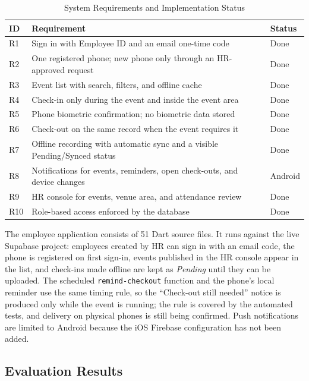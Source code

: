 \documentclass[conference]{IEEEtran}
\begin{document}
\begin{table}[!t]
\caption{System Requirements and Implementation Status}
\label{tab:requirements}
\centering
\footnotesize
\begin{tabularx}{\columnwidth}{@{}l Y l@{}}
\toprule
ID & Requirement & Status\\
\midrule
R1 & Sign in with Employee ID and an email one-time code &
Done\\
R2 & One registered phone; new phone only through an HR-approved
request & Done\\
R3 & Event list with search, filters, and offline cache & Done\\
R4 & Check-in only during the event and inside the event area &
Done\\
R5 & Phone biometric confirmation; no biometric data stored & Done\\
R6 & Check-out on the same record when the event requires it &
Done\\
R7 & Offline recording with automatic sync and a visible
Pending/Synced status & Done\\
R8 & Notifications for events, reminders, open check-outs, and
device changes & Android\\
R9 & HR console for events, venue area, and attendance review &
Done\\
R10 & Role-based access enforced by the database & Done\\
\bottomrule
\end{tabularx}
\end{table}

The employee application consists of 51 Dart source files. It runs
against the live Supabase project: employees created by HR can sign in
with an email code, the phone is registered on first sign-in, events
published in the HR console appear in the list, and check-ins made
offline are kept as \textit{Pending} until they can be uploaded. The
scheduled \texttt{remind-checkout} function and the phone's local
reminder use the same timing rule, so the ``Check-out still needed''
notice is produced only while the event is running; the rule is covered
by the automated tests, and delivery on physical phones is still being
confirmed. Push notifications are limited to Android because the iOS
Firebase configuration has not been added.

\subsection{Evaluation Results}
\end{document}
